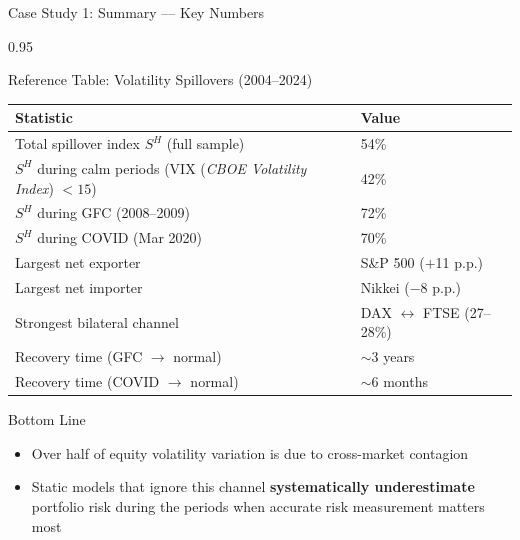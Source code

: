 \documentclass[9pt, aspectratio=169, t]{beamer}
\begin{document}
\begin{frame}{Case Study 1: Summary --- Key Numbers}
    \begin{cminipage}{0.95\textwidth}
    {\footnotesize
    \begin{block}{Reference Table: Volatility Spillovers (2004--2024)}
        {\small
        \begin{center}
        \begin{tabular}{l|l}
            \hline
            \textbf{Statistic} & \textbf{Value} \\
            \hline
            Total spillover index $S^H$ (full sample) & 54\% \\
            $S^H$ during calm periods (VIX (\textit{CBOE Volatility Index}) $< 15$) & 42\% \\
            $S^H$ during GFC (2008--2009) & 72\% \\
            $S^H$ during COVID (Mar 2020) & 70\% \\
            Largest net exporter & S\&P 500 ($+$11 p.p.) \\
            Largest net importer & Nikkei ($-$8 p.p.) \\
            Strongest bilateral channel & DAX $\leftrightarrow$ FTSE (27--28\%) \\
            Recovery time (GFC $\rightarrow$ normal) & $\sim$3 years \\
            Recovery time (COVID $\rightarrow$ normal) & $\sim$6 months \\
            \hline
        \end{tabular}
        \end{center}
        }
    \end{block}
    \vspace{-2mm}
    \begin{alertblock}{Bottom Line}
        \begin{itemize}\setlength{\itemsep}{0pt}
            \item Over half of equity volatility variation is due to cross-market contagion
            \item Static models that ignore this channel \textbf{systematically underestimate} portfolio risk during the periods when accurate risk measurement matters most
        \end{itemize}
    \end{alertblock}
    }
    \end{cminipage}
\end{frame}
\end{document}
